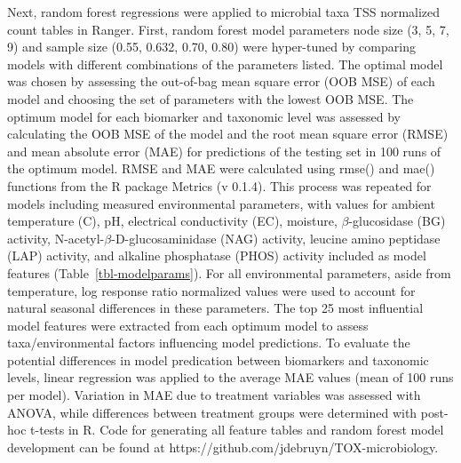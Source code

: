 \documentclass[
  10pt,
  letterpaper,
]{article}
\begin{document}
Next, random forest regressions were applied to microbial taxa TSS
normalized count tables in Ranger. First, random forest model parameters
node size (3, 5, 7, 9) and sample size (0.55, 0.632, 0.70, 0.80) were
hyper-tuned by comparing models with different combinations of the
parameters listed. The optimal model was chosen by assessing the
out-of-bag mean square error (OOB MSE) of each model and choosing the
set of parameters with the lowest OOB MSE. The optimum model for each
biomarker and taxonomic level was assessed by calculating the OOB MSE of
the model and the root mean square error (RMSE) and mean absolute error
(MAE) for predictions of the testing set in 100 runs of the optimum
model. RMSE and MAE were calculated using rmse() and mae() functions
from the R package Metrics (v 0.1.4). This process was repeated for
models including measured environmental parameters, with values for
ambient temperature (\textdegree C), pH, electrical conductivity (EC),
moisture, \(\beta\)-glucosidase (BG) activity,
N-acetyl-\(\beta\)-D-glucosaminidase (NAG) activity, leucine amino
peptidase (LAP) activity, and alkaline phosphatase (PHOS) activity
included as model features (Table~\ref{tbl-modelparams}). For all
environmental parameters, aside from temperature, log response ratio
normalized values \citep{mason_body_2022, risch_effects_2020} were used
to account for natural seasonal differences in these parameters. The top
25 most influential model features were extracted from each optimum
model to assess taxa/environmental factors influencing model
predictions. To evaluate the potential differences in model predication
between biomarkers and taxonomic levels, linear regression was applied
to the average MAE values (mean of 100 runs per model). Variation in MAE
due to treatment variables was assessed with ANOVA, while differences
between treatment groups were determined with post-hoc t-tests in R.
Code for generating all feature tables and random forest model
development can be found at
https://github.com/jdebruyn/TOX-microbiology.
\end{document}
